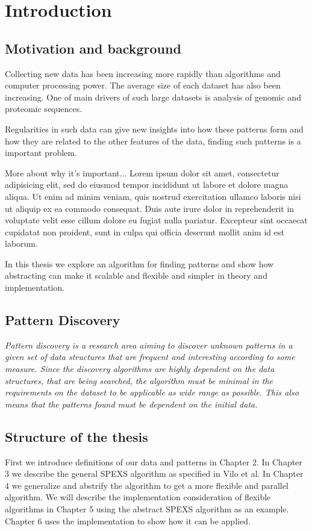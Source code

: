 \chapter{Introduction}

\section{Motivation and background}

Collecting new data has been increasing more rapidly than algorithms and
computer processing power. The average size of each dataset has also
been increasing. One of main drivers of such large datasets is analysis
of genomic and proteomic sequences.

Regularities in such data can give new insights into how these patterns form
and how they are related to the other features of the data, finding such
patterns is a important problem.


More about why it's important... Lorem ipsum dolor sit amet, consectetur 
adipisicing elit, sed do eiusmod
tempor incididunt ut labore et dolore magna aliqua. Ut enim ad minim veniam,
quis nostrud exercitation ullamco laboris nisi ut aliquip ex ea commodo
consequat. Duis aute irure dolor in reprehenderit in voluptate velit esse
cillum dolore eu fugiat nulla pariatur. Excepteur sint occaecat cupidatat non
proident, sunt in culpa qui officia deserunt mollit anim id est laborum.

In this thesis we explore an algorithm for finding patterns and show how
abstracting can make it scalable and flexible and simpler in theory and
implementation.

\section{Pattern Discovery}

\em{Pattern discovery} is a research area aiming to discover unknown patterns
in a given set of data structures that are frequent and interesting according 
to some measure. Since the discovery algorithms are highly dependent on the
data structures, that are being searched, the algorithm must be minimal
in the requirements on the dataset to be applicable as wide range as possible.
This also means that the patterns found must be dependent on the initial data.


\section{Structure of the thesis}

First we introduce definitions of our data and patterns in Chapter 2. In
Chapter 3 we describe the general SPEXS algorithm as specified in Vilo et al.
In Chapter 4 we generalize and abstrify the algorithm to get a more flexible
and parallel algorithm. We will describe the implementation consideration of
flexible algorithms in Chapter 5 using the abstract SPEXS algorithm as an
example. Chapter 6 uses the implementation to show how it can be applied.